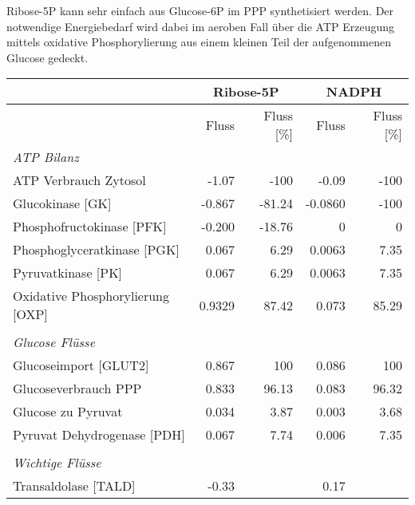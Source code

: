Ribose-5P kann sehr einfach aus Glucose-6P im PPP synthetisiert werden. Der notwendige Energiebedarf wird dabei im aeroben Fall über die ATP Erzeugung mittels oxidative Phosphorylierung aus einem kleinen Teil der aufgenommenen Glucose gedeckt.
\begin{table}[!ht]
\begin{minipage}[c]{\textwidth}
\centering
\tiny
\begin{tabular}{l rr rr}
\toprule
 & \multicolumn{2}{c}{\textbf{Ribose-5P}} & \multicolumn{2}{c}{\textbf{NADPH}}\\
\midrule
 & Fluss & Fluss [\%] & Fluss & Fluss [\%] \\
\cmidrule(l){2-5}
\textit{ATP Bilanz}& & & & \\
\hspace*{5mm}ATP Verbrauch Zytosol & -1.07 & -100 & -0.09 & -100\\
\hspace*{5mm}Glucokinase [GK] & -0.867 & -81.24 & -0.0860 & -100\\
\hspace*{5mm}Phosphofructokinase [PFK] & -0.200 & -18.76 & 0 & 0\\
\hspace*{5mm}Phosphoglyceratkinase [PGK] & 0.067 & 6.29 & 0.0063 & 7.35\\
\hspace*{5mm}Pyruvatkinase [PK] & 0.067 & 6.29 & 0.0063 & 7.35\\
\hspace*{5mm}Oxidative Phosphorylierung [OXP] & 0.9329 & 87.42 & 0.073 & 85.29\\
 &  &  &  & \\
\textit{Glucose Flüsse} &  &  &  & \\
\hspace*{5mm}Glucoseimport [GLUT2] & 0.867 & 100 & 0.086 & 100\\
\hspace*{5mm}Glucoseverbrauch PPP & 0.833 & 96.13 & 0.083 & 96.32\\
\hspace*{5mm}Glucose zu Pyruvat & 0.034 & 3.87 & 0.003 & 3.68\\
\hspace*{5mm}Pyruvat Dehydrogenase [PDH] & 0.067 & 7.74 & 0.006 & 7.35\\
 &  &  &  & \\
\textit{Wichtige Flüsse} &  &  &  & \\
\hspace*{5mm}Transaldolase [TALD] & -0.33 &  & 0.17 & \\

\end{tabular}
\end{minipage}
\end{table}
